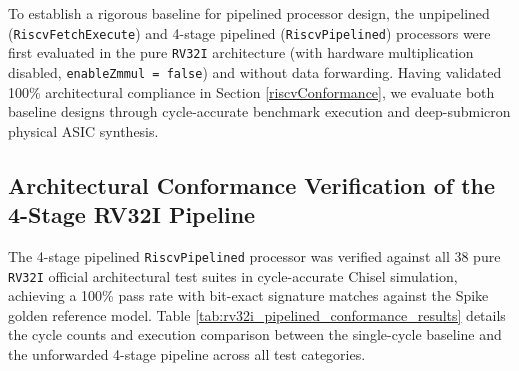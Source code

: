 To establish a rigorous baseline for pipelined processor design, the unpipelined (\texttt{RiscvFetchExecute}) and 4-stage pipelined (\texttt{RiscvPipelined}) processors were first evaluated in the pure \texttt{RV32I} architecture (with hardware multiplication disabled, \texttt{enableZmmul = false}) and without data forwarding. Having validated 100\% architectural compliance in Section \ref{riscvConformance}, we evaluate both baseline designs through cycle-accurate benchmark execution and deep-submicron physical ASIC synthesis.

\subsection{Architectural Conformance Verification of the 4-Stage RV32I Pipeline}

The 4-stage pipelined \texttt{RiscvPipelined} processor was verified against all 38 pure \texttt{RV32I} official architectural test suites in cycle-accurate Chisel simulation, achieving a 100\% pass rate with bit-exact signature matches against the Spike golden reference model. Table \ref{tab:rv32i_pipelined_conformance_results} details the cycle counts and execution comparison between the single-cycle baseline and the unforwarded 4-stage pipeline across all test categories.

\begin{table}[htbp]
\centering
\small
{}
\caption{Official RISC-V \texttt{RV32I} architectural conformance results and cycle counts for single-cycle vs.\ 4-stage pipelined cores without forwarding (100\% signature match across all 38 test suites).}\label{tab:rv32i_pipelined_conformance_results}
\end{table}


